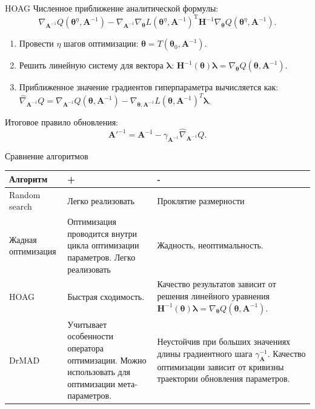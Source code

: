 \documentclass[10pt,pdf,utf8,russian,aspectratio=169]{beamer}
\begin{document}
\begin{frame}{HOAG}
Численное приближение аналитической формулы:
 \[\nabla_{\mathbf{A}^{-1}}Q(\boldsymbol{\theta}^\eta, \mathbf{A}^{-1}) - \nabla_{\mathbf{A}^{-1}}\nabla_{\boldsymbol{\theta}} L(\boldsymbol{\theta}^\eta, \mathbf{A}^{-1})^\text{T}\mathbf{H}^{-1}\nabla_{\boldsymbol{\theta}}Q(\boldsymbol{\theta}^\eta, \mathbf{A}^{-1}).\]
\begin{enumerate}
\item Провести $\eta$ шагов оптимизации: $\boldsymbol{\theta} = T(\boldsymbol{\theta}_0, \mathbf{A}^{-1})$.
\item Решить линейную систему для вектора $\boldsymbol{\lambda}$: $\mathbf{H}^{-1}(\boldsymbol{\theta})\boldsymbol{\lambda} =  \nabla_{\boldsymbol{\theta}} Q(\boldsymbol{\theta}, \mathbf{A}^{-1})$.
\item Приближенное значение градиентов гиперпараметра вычисляется как: $\hat{\nabla}_{\mathbf{A}^{-1}}Q = \nabla_{\mathbf{A}^{-1}}Q(\boldsymbol{\theta}, \mathbf{A}^{-1}) -\nabla_{\boldsymbol{\theta}, \mathbf{A}^{-1}} L(\boldsymbol{\theta}, \mathbf{A}^{-1})^T\boldsymbol{\lambda}$.
\end{enumerate}

Итоговое правило обновления:
\[
\label{eq:update_hyper}
\mathbf{A}'^{-1} = \mathbf{A}^{-1} - \gamma_{\mathbf{A}^{-1}} \hat{\nabla}_{\mathbf{A}^{-1}}Q.
\]


\end{frame}

\begin{frame}{Сравнение алгоритмов}
\begin{table}

\begin{tabularx}{\textwidth}{|p{2cm}|X|X|}
\hline
\bf Алгоритм &  \bf + & \bf -  \\ \hline
Random search & Легко реализовать & Проклятие размерности  \\ \hline
Жадная оптимизация & Оптимизация проводится внутри цикла оптимизации параметров. Легко реализовать & Жадность, неоптимальность. \\ \hline
HOAG  & Быстрая сходимость.  & Качество результатов зависит от решения линейного уравнения $\mathbf{H}^{-1}(\boldsymbol{\theta})\boldsymbol{\lambda} =  \nabla_{\boldsymbol{\theta}} Q(\boldsymbol{\theta}, \mathbf{A}^{-1})$.\\ \hline 
DrMAD  & Учитывает особенности оператора оптимизации. Можно использовать для оптимизации мета-параметров.& Неустойчив при больших значениях длины градиентного шага $\gamma_\mathbf{A}^{-1}$. Качество оптимизации зависит от кривизны траектории обновления параметров.\\ \hline
\end{tabularx}


\label{table:algo_descr}

\end{table}
\end{frame}
\end{document}
